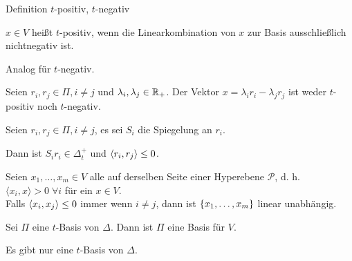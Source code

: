 \documentclass{beamer}
\begin{document}
\begin{frame}{Definition \(t\)-positiv, \( t \)-negativ}
    \begin{defi}
        \( x \in V \) heißt \(t\)-positiv, wenn 
        die Linearkombination von \(x\) zur 
        Basis ausschließlich nichtnegativ ist.

        Analog für \( t \)-negativ.
    \end{defi}
    \pause
    \begin{satz} %
        Seien \( r_i, r_j \in \Pi, i \neq j \) und 
        \( \lambda_i, \lambda_j \in \mathbb{R}_+ \). 
        Der Vektor \( x = \lambda_i r_i - \lambda_j r_j \) 
        ist weder \( t \)-positiv noch \( t \)-negativ.
    \end{satz}
\end{frame}

\begin{frame}
    \begin{satz} %
        
        Seien \( r_i, r_j \in \Pi, i \neq j \), es 
        sei \( S_i \) die Spiegelung an \( r_i \). 

        Dann ist \( S_i r_i \in \Delta_t^+ \) und 
        \( \langle r_i, r_j \rangle \leq 0 \).
    \end{satz}\pause

    \begin{satz} %
        Seien \( x_1, \ldots, x_m \in V \) alle auf derselben 
        Seite einer Hyperebene \( \mathscr{P} \), 
        d. h. \( \langle x_i, x \rangle > 0 \;\forall i \) für 
        ein \( x\in V \). \\
        Falls \( \langle x_i, x_j \rangle \leq 0 \) immer wenn 
        \( i \neq j \), dann ist \( \{x_1, \ldots, x_m\} \) 
        linear unabhängig.
    \end{satz}
\end{frame}

\begin{frame}
    \begin{satz} %
        Sei \( \Pi \) eine \(t\)-Basis von \( \Delta \). Dann ist 
        \( \Pi \) eine Basis für \( V \).
    \end{satz}\pause
    \begin{satz} %
        Es gibt nur eine \( t \)-Basis von \( \Delta \).
    \end{satz}
\end{frame}
\end{document}
